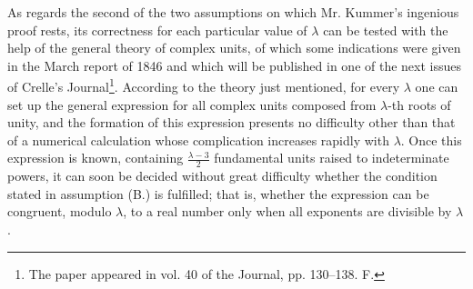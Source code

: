 \documentclass[11pt]{article}
\begin{document}
As regards the second of the two assumptions on which Mr. Kummer's ingenious proof rests, its correctness for each particular value of $\lambda$ can be tested with the help of the general theory of complex units, of which some indications were given in the March report of 1846 and which will be published in one of the next issues of Crelle's Journal\footnote{The paper appeared in vol. 40 of the Journal, pp. 130--138. \textnormal{F.}}. According to the theory just mentioned, for every $\lambda$ one can set up the general expression for all complex units composed from $\lambda$-th roots of unity, and the formation of this expression presents no difficulty other than that of a numerical calculation whose complication increases rapidly with $\lambda$. Once this expression is known, containing $\frac{\lambda-3}{2}$ fundamental units raised to indeterminate powers, it can soon be decided without great difficulty whether the condition stated in assumption (B.) is fulfilled; that is, whether the expression can be congruent, modulo $\lambda$, to a real number only when all exponents are divisible by $\lambda$.
\end{document}
